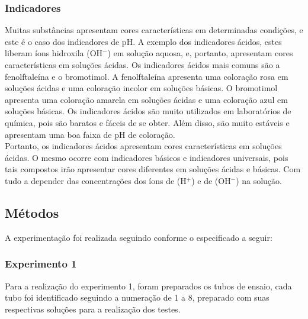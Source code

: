     \subsubsection{Indicadores}\label{subsubsec:mat_materiais_indicadores}
    \indent Muitas substâncias apresentam cores características em determinadas condições, e este é o caso dos indicadores de pH. A exemplo dos indicadores ácidos, estes liberam íons hidroxila (OH$^-$) em solução aquosa, e, portanto, apresentam cores características em soluções ácidas.
    Os indicadores ácidos mais comuns são a fenolftaleína e o bromotimol.
    A fenolftaleína apresenta uma coloração rosa em soluções ácidas e uma coloração incolor em soluções básicas.
    O bromotimol apresenta uma coloração amarela em soluções ácidas e uma coloração azul em soluções básicas.
    Os indicadores ácidos são muito utilizados em laboratórios de química, pois são baratos e fáceis de se obter.
    Além disso, são muito estáveis e apresentam uma boa faixa de pH de coloração.\\
    Portanto, os indicadores ácidos apresentam cores características em soluções ácidas.
    O mesmo ocorre com indicadores básicos e indicadores universais, pois tais compostos irão apresentar cores diferentes em soluções ácidas e básicas.
    Com tudo a depender das concentrações dos íons de (H$^+$) e de (OH$^-$) na solução.

    \subsection{Métodos}\label{subsec:mat_metodos}
        \indent A experimentação foi realizada seguindo conforme o especificado a seguir:

    \subsubsection{Experimento 1}\label{subsubsec:mat_metodos_exp1}
        \indent Para a realização do experimento 1, foram preparados os tubos de ensaio, cada tubo foi identificado seguindo a numeração de 1 a 8, preparado com suas respectivas soluções para a realização dos testes.\\

